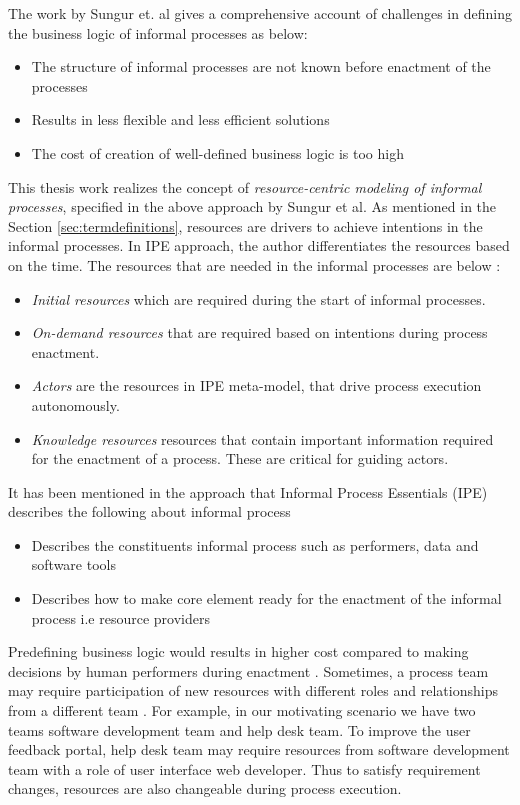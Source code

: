 The work by Sungur et. al \cite{Sungur2014a} gives a comprehensive account of challenges in defining the business logic of informal processes as below:

\begin{itemize}
	\item The structure of informal processes are not known before enactment of the processes
	\item Results in less flexible and less efficient solutions
	\item The cost of creation of well-defined business logic is too high
\end{itemize}

This thesis work realizes the concept of \textit{resource-centric modeling of informal processes}, specified in the above approach by Sungur et al.  As mentioned in the Section \ref{sec:termdefinitions}, resources are drivers to achieve intentions in the informal processes. In IPE approach, the author differentiates the resources based on the time. The resources that are needed in the informal processes are below :
  \begin{itemize}
  	\item \textit{Initial resources} which are required during the start of informal processes.
  	\item \textit{On-demand resources} that are required based on intentions during process enactment.
  	\item \textit{Actors} are the resources in IPE meta-model, that drive process execution autonomously.
  	\item \textit{Knowledge resources} resources that contain important information required for the enactment of a process. These are critical for guiding actors.  
  \end{itemize}
 
It has been mentioned in the approach \cite{Sungur2014} that Informal Process Essentials (IPE) describes the following about informal process  

\begin{itemize}
	\item Describes the constituents informal process such as performers, data and software tools
	\item Describes how to make core element ready for the enactment of the informal process i.e resource providers
\end{itemize}

Predefining business logic would results in higher cost compared to making decisions by human performers during enactment \cite{Sungur2014}. Sometimes, a process team may require participation of  new resources with different roles and relationships from a different team \cite{Matthews2011,Matthews2012}. For example, in our motivating scenario we have two teams  software development team and help desk team. To improve the user feedback portal, help desk team may require resources from software development team with a role of user interface web developer. Thus to satisfy requirement changes, resources are also changeable during process execution. 

